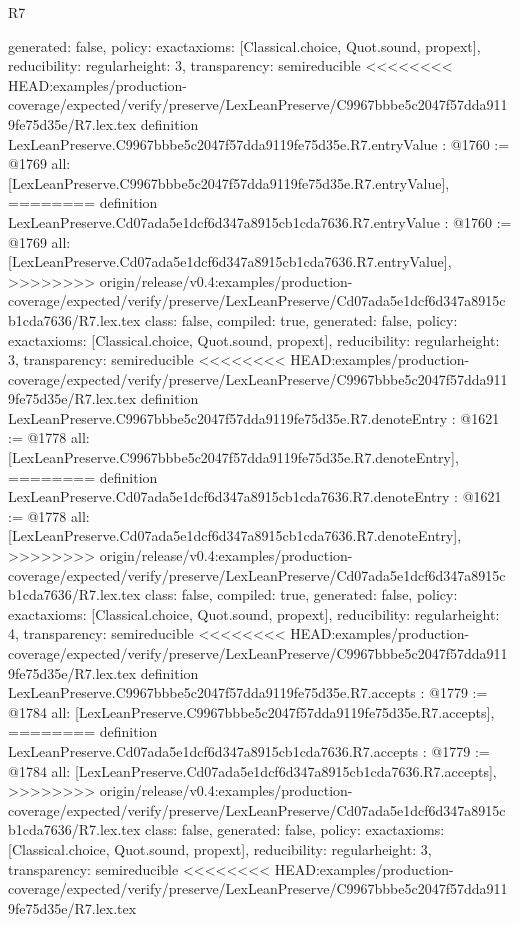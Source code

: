 \begin{lexlean}{R7}
\begin{coremodule}
{{{{{{{{{{{{{{{  generated: false,
  policy: exact{axioms: [Classical.choice, Quot.sound, propext]},
  reducibility: regular{height: 3},
  transparency: semireducible
}
<<<<<<<< HEAD:examples/production-coverage/expected/verify/preserve/LexLeanPreserve/C9967bbbe5c2047f57dda9119fe75d35e/R7.lex.tex
definition LexLeanPreserve.C9967bbbe5c2047f57dda9119fe75d35e.R7.entryValue : @1760 := @1769 {
  all: [LexLeanPreserve.C9967bbbe5c2047f57dda9119fe75d35e.R7.entryValue],
========
definition LexLeanPreserve.Cd07ada5e1dcf6d347a8915cb1cda7636.R7.entryValue : @1760 := @1769 {
  all: [LexLeanPreserve.Cd07ada5e1dcf6d347a8915cb1cda7636.R7.entryValue],
>>>>>>>> origin/release/v0.4:examples/production-coverage/expected/verify/preserve/LexLeanPreserve/Cd07ada5e1dcf6d347a8915cb1cda7636/R7.lex.tex
  class: false,
  compiled: true,
  generated: false,
  policy: exact{axioms: [Classical.choice, Quot.sound, propext]},
  reducibility: regular{height: 3},
  transparency: semireducible
}
<<<<<<<< HEAD:examples/production-coverage/expected/verify/preserve/LexLeanPreserve/C9967bbbe5c2047f57dda9119fe75d35e/R7.lex.tex
definition LexLeanPreserve.C9967bbbe5c2047f57dda9119fe75d35e.R7.denoteEntry : @1621 := @1778 {
  all: [LexLeanPreserve.C9967bbbe5c2047f57dda9119fe75d35e.R7.denoteEntry],
========
definition LexLeanPreserve.Cd07ada5e1dcf6d347a8915cb1cda7636.R7.denoteEntry : @1621 := @1778 {
  all: [LexLeanPreserve.Cd07ada5e1dcf6d347a8915cb1cda7636.R7.denoteEntry],
>>>>>>>> origin/release/v0.4:examples/production-coverage/expected/verify/preserve/LexLeanPreserve/Cd07ada5e1dcf6d347a8915cb1cda7636/R7.lex.tex
  class: false,
  compiled: true,
  generated: false,
  policy: exact{axioms: [Classical.choice, Quot.sound, propext]},
  reducibility: regular{height: 4},
  transparency: semireducible
}
<<<<<<<< HEAD:examples/production-coverage/expected/verify/preserve/LexLeanPreserve/C9967bbbe5c2047f57dda9119fe75d35e/R7.lex.tex
definition LexLeanPreserve.C9967bbbe5c2047f57dda9119fe75d35e.R7.accepts : @1779 := @1784 {
  all: [LexLeanPreserve.C9967bbbe5c2047f57dda9119fe75d35e.R7.accepts],
========
definition LexLeanPreserve.Cd07ada5e1dcf6d347a8915cb1cda7636.R7.accepts : @1779 := @1784 {
  all: [LexLeanPreserve.Cd07ada5e1dcf6d347a8915cb1cda7636.R7.accepts],
>>>>>>>> origin/release/v0.4:examples/production-coverage/expected/verify/preserve/LexLeanPreserve/Cd07ada5e1dcf6d347a8915cb1cda7636/R7.lex.tex
  class: false,
  generated: false,
  policy: exact{axioms: [Classical.choice, Quot.sound, propext]},
  reducibility: regular{height: 3},
  transparency: semireducible
}
<<<<<<<< HEAD:examples/production-coverage/expected/verify/preserve/LexLeanPreserve/C9967bbbe5c2047f57dda9119fe75d35e/R7.lex.tex
}}}}}}}}}}}}}}}}}
\end{coremodule}
\end{lexlean}
